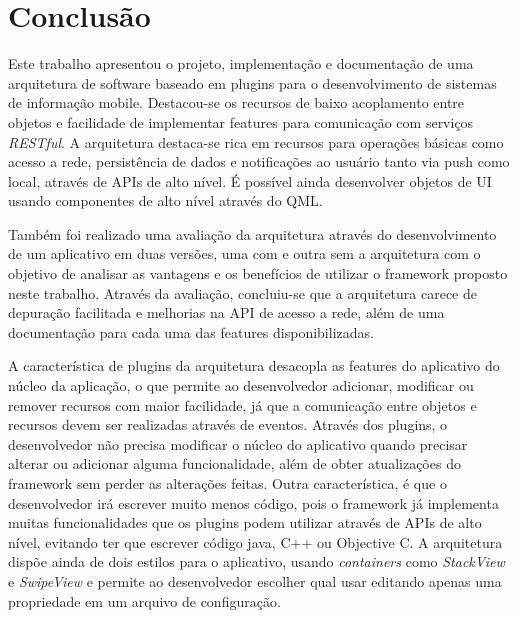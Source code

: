 \section{Conclusão}\label{sec:conclusao}
Este trabalho apresentou o projeto, implementação e documentação de uma arquitetura de software baseado em plugins para o desenvolvimento de sistemas de informação mobile. Destacou-se os recursos de baixo acoplamento entre objetos e facilidade de implementar features para comunicação com serviços \textit{RESTful}. A arquitetura destaca-se rica em recursos para operações básicas como acesso a rede, persistência de dados e notificações ao usuário tanto via push como local, através de APIs de alto nível. É possível ainda desenvolver objetos de UI usando componentes de alto nível através do QML.\par

Também foi realizado uma avaliação da arquitetura através do desenvolvimento de um aplicativo em duas versões, uma com e outra sem a arquitetura com o objetivo de analisar as vantagens e os benefícios de utilizar o framework proposto neste trabalho. Através da avaliação, concluiu-se que a arquitetura carece de depuração facilitada e melhorias na API de acesso a rede, além de uma documentação para cada uma das features disponibilizadas.\par

A característica de plugins da arquitetura desacopla as features do aplicativo do núcleo da aplicação, o que permite ao desenvolvedor adicionar, modificar ou remover recursos com maior facilidade, já que a comunicação entre objetos e recursos devem ser realizadas através de eventos. Através dos plugins, o desenvolvedor não precisa modificar o núcleo do aplicativo quando precisar alterar ou adicionar alguma funcionalidade, além de obter atualizações do framework sem perder as alterações feitas. Outra característica, é que o desenvolvedor irá escrever muito menos código, pois o framework já implementa muitas funcionalidades que os plugins podem utilizar através de APIs de alto nível, evitando ter que escrever código java, C++ ou Objective C. A arquitetura dispõe ainda de dois estilos para o aplicativo, usando \textit{containers} como \textit{StackView} e \textit{SwipeView} e permite ao desenvolvedor escolher qual usar editando apenas uma propriedade em um arquivo de configuração.

